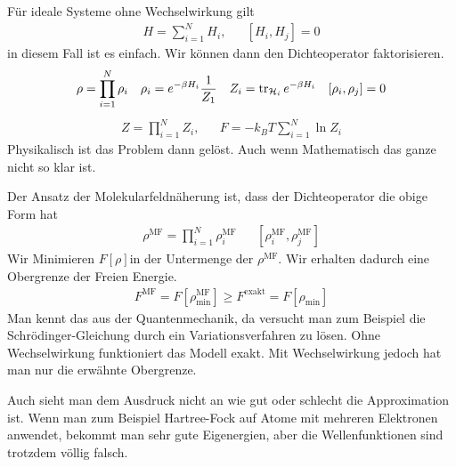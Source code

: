 Für ideale Systeme ohne Wechselwirkung gilt
%
\begin{align*}
  H = \sum_{i=1}^{N} H_i, && [H_i, H_j] = 0
\end{align*}
%
in diesem Fall ist es einfach. Wir können dann den Dichteoperator faktorisieren.
%
\begin{align*}
  \rho = \prod_{i=1}^{N} \rho_i && \rho_i = e^{-\beta H_i} \frac{1}{Z_1} && Z_i = \operatorname{tr}_{\mathcal{H}_i}
  e^{-\beta H_i} && [\rho_i, \rho_j] = 0
\end{align*}
%
%
\begin{align*}
  Z = \prod_{i=1}^{N} Z_i, && F = - k_B T \sum_{i=1}^{N} \ln{Z_i}
\end{align*}
Physikalisch ist das Problem dann gelöst. Auch wenn Mathematisch das ganze nicht
so klar ist. 

Der Ansatz der Molekularfeldnäherung ist, dass der Dichteoperator die
obige Form hat
%
\begin{align*}
  \rho^{\text{MF}} = \prod_{i=1}^{N} \rho_i^\text{MF} &&
  [\rho_i^\text{MF}, \rho_j^\text{MF}]
\end{align*}
%
Wir Minimieren $F[\rho]$in der Untermenge der $\rho^\text{MF}$. Wir erhalten
dadurch eine Obergrenze der Freien Energie.
%
\begin{align*}
  F^\text{MF} = F \left[ \rho_\text{min}^\text{MF} \right] \ge
  F^\text{exakt} = F [\rho_\text{min}]
\end{align*}
%
Man kennt das aus der Quantenmechanik, da versucht man zum Beispiel die Schrödinger-Gleichung
durch ein Variationsverfahren zu lösen. Ohne Wechselwirkung funktioniert das Modell exakt.
Mit Wechselwirkung jedoch hat man nur die erwähnte Obergrenze.

Auch sieht man dem Ausdruck nicht an wie gut oder schlecht die Approximation ist.
Wenn man zum Beispiel Hartree-Fock auf Atome mit mehreren Elektronen anwendet,
bekommt man sehr gute Eigenergien, aber die Wellenfunktionen sind trotzdem völlig
falsch.

